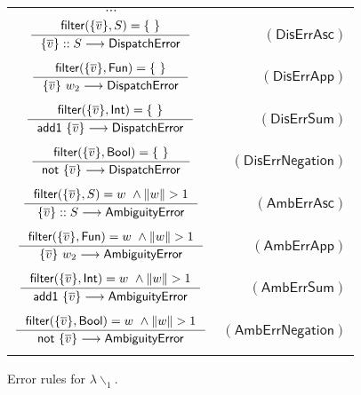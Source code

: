 \documentclass[preprint,authoryear,sort&compress,9pt,nocopyrightspace]{article}
\newcommand\rulename[1]{\mathsf{(#1)}}
\newcommand{\tto}{\longrightarrow}
\newcommand{\conf}[2][s]{(#2)[#1]}
\newcommand{\confextW}[1]{#1 [x \mapsto w \oplus s]}
\newcommand{\ascripS}[1]{#1::S}
\newcommand{\oletP}[3]{\mathsf{mlet} \ x = #2 \ \mathsf{in}  \ #3}
\newcommand{\absST}[2]{\lambda #1. \ #2}
\newcommand{\negacion}[1]{\mathsf{not} \ #1}
\newcommand{\suma}[1]{\mathsf{add1} \ #1}
\newcommand{\boolt}{\mathsf{Bool}}
\newcommand{\intt}{\mathsf{Int}}
\newcommand{\funt}{\mathsf{Fun}}
\newcommand{\filtrar}{\mathsf{filter}}
\newcommand{\buscar}{\mathsf{lookup}}
\newcommand{\dispatcherror}{\mathsf{DispatchError}}
\newcommand{\ambiguityerror}{\mathsf{AmbiguityError}}
\newcommand{\semanticCc}{${\lambda}{\backslash}_1$}
\begin{document}
\begin{figure}[]
\begin{small}
\begin{center}
\begin{tabular}{|c r|}
\hline
$\cdots$&\\
$ \inference {\filtrar(\{\overline{v}\}, S) = \{\ \}} {\ascripS{\{\overline{v}\}} \tto \dispatcherror} $&$\rulename{DisErrAsc} $\\
&\\

$\inference{ \filtrar(\{\overline{v}\}, \funt) = \{ \ \}}{\{\overline{v}\} \ w_2 \tto \dispatcherror}$&$\rulename{DisErrApp}$\\
&\\
$\inference {\filtrar(\{\overline{v}\}, \intt)  = \{\ \} }{\suma{\{\overline{v}\}} \tto \dispatcherror}$&$\rulename{DisErrSum}$\\
&\\
$\inference {\filtrar(\{\overline{v}\}, \boolt)  = \{ \ \} }{\negacion{\{\overline{v}\}}\tto \dispatcherror}$&$\rulename{DisErrNegation}$\\
&\\

$ \inference {\filtrar(\{\overline{v}\}, S) = w \ \wedge \|w\| > 1} {\ascripS{\{\overline{v}\}} \tto \ambiguityerror} $&$\rulename{AmbErrAsc} $\\
&\\

$\inference{ \filtrar(\{\overline{v}\}, \funt) = w \ \wedge \|w\| > 1}{\{\overline{v}\} \ w_2 \tto \ambiguityerror}$&$\rulename{AmbErrApp}$\\
&\\
$\inference {\filtrar(\{\overline{v}\}, \intt)  = w \ \wedge \|w\| > 1}{\suma{\{\overline{v}\}} \tto \ambiguityerror}$&$\rulename{AmbErrSum}$\\
&\\
$\inference {\filtrar(\{\overline{v}\}, \boolt)  = w \ \wedge \|w\| > 1}{\negacion{\{\overline{v}\}}\tto \ambiguityerror}$&$\rulename{AmbErrNegation}$\\
&\\
\hline
\end{tabular}
\caption{Error rules for \semanticCc.}
\label{tabla:errorRulesStrictMore}
\end{center}
\end{small}
\end{figure}
\end{document}
